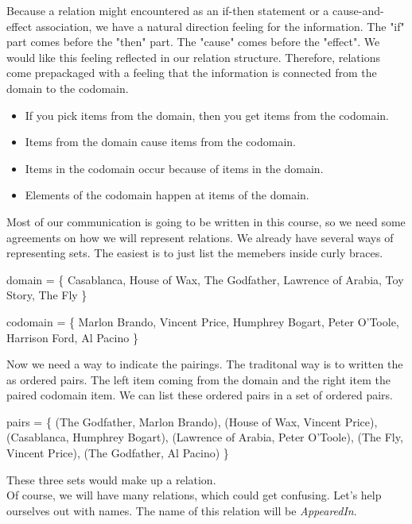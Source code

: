 \documentclass{ximera}
\begin{document}
Because a relation might encountered as an if-then statement or a cause-and-effect association, we have a natural direction feeling for the information.  The "if" part comes before the "then" part.  The "cause" comes before the "effect".  We would like this feeling reflected in our relation structure.  Therefore, relations come prepackaged with a feeling that the information is connected from the domain to the codomain.

\begin{itemize}
\item If you pick items from the domain, then you get items from the codomain.
\item Items from the domain cause items from the codomain.
\item Items in the codomain occur because of items in the domain.
\item Elements of the codomain happen at items of the domain.
\end{itemize}

Most of our communication is going to be written in this course, so we need some agreements on how we will represent relations.  We already have several ways of representing sets.  The easiest is to just list the memebers inside curly braces.

\begin{center} 
domain = \{ Casablanca, House of Wax,  The Godfather, Lawrence of Arabia, Toy Story, The Fly \} 
\end{center}

\begin{center} 
codomain = \{ Marlon Brando, Vincent Price, Humphrey Bogart, Peter O'Toole, Harrison Ford, Al Pacino \} 
\end{center}

Now we need a way to indicate the pairings.  The traditonal way is to written the as ordered pairs.  The left item coming from the domain and the right item the paired codomain item.  We can list these ordered pairs in a set of ordered pairs.

\begin{center} 
pairs = \{ (The Godfather, Marlon Brando), (House of Wax, Vincent Price), (Casablanca, Humphrey Bogart), (Lawrence of Arabia, Peter O'Toole), (The Fly, Vincent Price), (The Godfather, Al Pacino) \} 
\end{center}


These three sets would make up a relation. \\

Of course, we will have many relations, which could get confusing.  Let's help ourselves out with names.  The name of this relation will be \textit{AppearedIn}.
\end{document}
